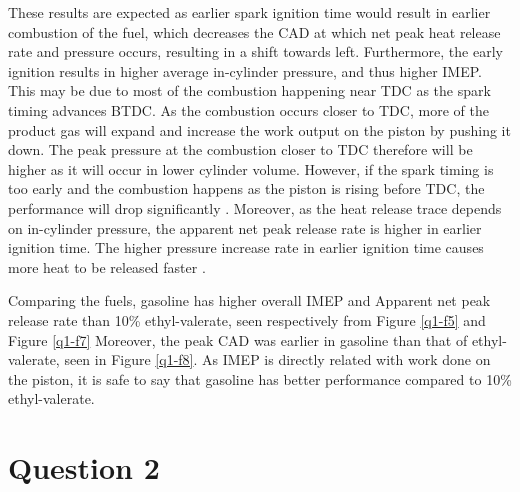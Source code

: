 \documentclass[11pt]{article}
\begin{document}
These results are expected as earlier spark ignition time would result in earlier combustion of the fuel, which decreases the CAD at which net peak heat release rate and pressure occurs, resulting in a shift towards left. Furthermore, the early ignition results in higher average in-cylinder pressure, and thus higher IMEP. This may be due to most of the combustion happening near TDC as the spark timing advances BTDC. As the combustion occurs closer to TDC, more of the product gas will expand and increase the work output on the piston by pushing it down. The peak pressure at the combustion closer to TDC therefore will be higher as it will occur in lower cylinder volume. However, if the spark timing is too early and the combustion happens as the piston is rising before TDC, the performance will drop significantly \cite{q1-r1}. Moreover, as the heat release trace depends on in-cylinder pressure, the apparent net peak release rate is higher in earlier ignition time. The higher pressure increase rate in earlier ignition time causes more heat to be released faster \cite{q1-r2}. 

Comparing the fuels, gasoline has higher overall IMEP and Apparent net peak release rate than 10\% ethyl-valerate, seen respectively from Figure \ref{q1-f5} and Figure \ref{q1-f7} Moreover, the peak CAD was earlier in gasoline than that of ethyl-valerate, seen in Figure \ref{q1-f8}. As IMEP is directly related with work done on the piston, it is safe to say that gasoline has better performance compared to 10\% ethyl-valerate. 
\section{Question 2}
\end{document}
